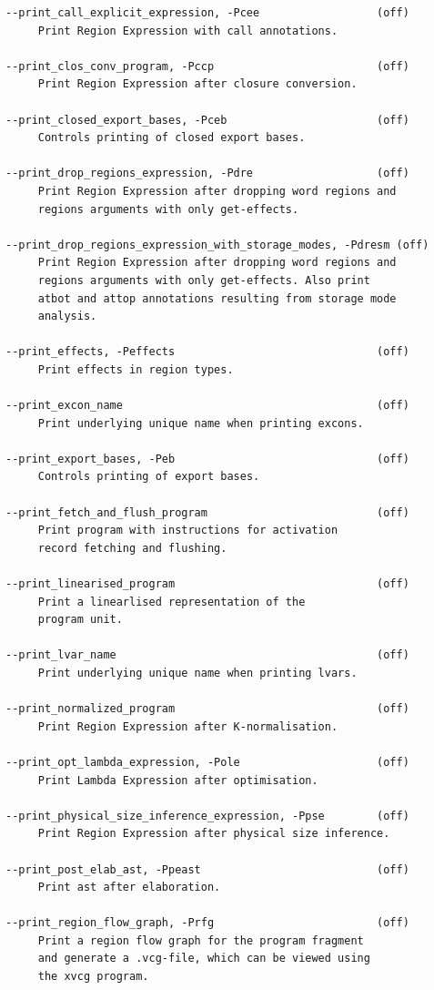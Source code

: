 \documentclass[12pt]{book}
\begin{document}
\begin{verbatim}
--print_call_explicit_expression, -Pcee                  (off)
     Print Region Expression with call annotations.

--print_clos_conv_program, -Pccp                         (off)
     Print Region Expression after closure conversion.

--print_closed_export_bases, -Pceb                       (off)
     Controls printing of closed export bases.

--print_drop_regions_expression, -Pdre                   (off)
     Print Region Expression after dropping word regions and
     regions arguments with only get-effects.

--print_drop_regions_expression_with_storage_modes, -Pdresm (off)
     Print Region Expression after dropping word regions and
     regions arguments with only get-effects. Also print
     atbot and attop annotations resulting from storage mode
     analysis.

--print_effects, -Peffects                               (off)
     Print effects in region types.

--print_excon_name                                       (off)
     Print underlying unique name when printing excons.

--print_export_bases, -Peb                               (off)
     Controls printing of export bases.

--print_fetch_and_flush_program                          (off)
     Print program with instructions for activation
     record fetching and flushing.

--print_linearised_program                               (off)
     Print a linearlised representation of the
     program unit.

--print_lvar_name                                        (off)
     Print underlying unique name when printing lvars.

--print_normalized_program                               (off)
     Print Region Expression after K-normalisation.

--print_opt_lambda_expression, -Pole                     (off)
     Print Lambda Expression after optimisation.

--print_physical_size_inference_expression, -Ppse        (off)
     Print Region Expression after physical size inference.

--print_post_elab_ast, -Ppeast                           (off)
     Print ast after elaboration.

--print_region_flow_graph, -Prfg                         (off)
     Print a region flow graph for the program fragment
     and generate a .vcg-file, which can be viewed using
     the xvcg program.


\end{verbatim}
\end{document}
